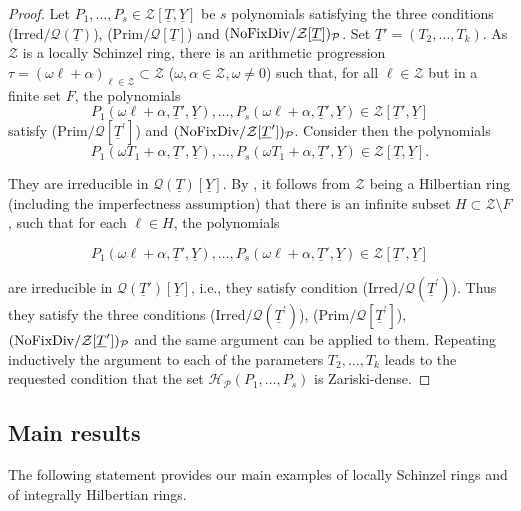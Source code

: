 \documentclass[11pt,a4paper,reqno]{amsart}
\theoremstyle{definition}
\begin{document}
\begin{proof} Let $P_1,\ldots,P_s \in {\mathcal Z}[\underline{T},\underline{Y}]$ be $s$ polynomials satisfying the three conditions (Irred$/{\mathcal Q}(\underline T)$), (Prim$/{\mathcal Q}[\underline T]$) and $\hbox{\rm (NoFixDiv}/{\mathcal Z}[\underline T])_{\mathcal P}$. Set $\underline{T}'=(T_2,\dots,T_k)$. As ${\mathcal Z}$ is a locally Schinzel ring, there is an arithmetic progression $\tau=(\omega \ell + \alpha)_{\ell \in {\mathcal Z}} \subset {\mathcal Z}$ ($\omega,\alpha \in {\mathcal Z},\omega \neq 0$) such that, for all $\ell \in {\mathcal Z}$ but in a finite set $F$, the polynomials
$$
P_1(\omega \ell +\alpha,\underline{T}',\underline{Y}),\dots,P_s(\omega \ell +\alpha,\underline{T}',\underline{Y}) \in {\mathcal Z}[\underline{T}',\underline{Y}]
$$
satisfy (Prim$/{\mathcal Q}[\underline T^\prime]$) and $\hbox{\rm (NoFixDiv}/{\mathcal Z}[\underline T^\prime])_{\mathcal P}$. Consider then the polynomials 
$$
P_1(\omega T_1 +\alpha,\underline{T}',\underline{Y}),\dots,P_s(\omega T_1 +\alpha,\underline{T}',\underline{Y}) \in {\mathcal Z}[\underline{T},\underline{Y}].
$$

\noindent
They are irreducible in ${\mathcal Q}(\underline{T})[\underline{Y}]$. By \cite[Proposition 4.2]{BDN20b}, it follows from ${\mathcal Z}$ being a Hilbertian ring (including the imperfectness assumption) that there is an infinite subset $H\subset {\mathcal Z}\setminus F$, such that for each $\ell \in H$, the polynomials

$$
P_1(\omega \ell +\alpha,\underline{T}',\underline{Y}),\dots,P_s(\omega \ell +\alpha,\underline{T}',\underline{Y}) \in {\mathcal Z}[\underline{T}',\underline{Y}]
$$

\noindent
are irreducible in ${\mathcal Q}(\underline{T}')[\underline{Y}]$, \hbox{i.e.}, they satisfy condition (Irred$/{\mathcal Q}(\underline T^\prime)$). Thus they satisfy the three conditions (Irred$/{\mathcal Q}(\underline T^\prime)$), (Prim$/{\mathcal Q}[\underline T^\prime]$), $\hbox{\rm (NoFixDiv}/{\mathcal Z}[\underline T^\prime])_{\mathcal P}$ and the same argument can be applied to them. Repeating inductively the argument  to each of the parameters $T_2,\ldots,T_k$ leads to the requested condition that the set ${\mathcal H}_{\mathcal{P}}(P_1,\ldots,P_s)$ is Zariski-dense. \end{proof}




\subsection{Main results} \label{ssex:main_results)}
The following statement provides our main examples of locally Schinzel rings and of integrally Hilbertian rings. 
\end{document}
